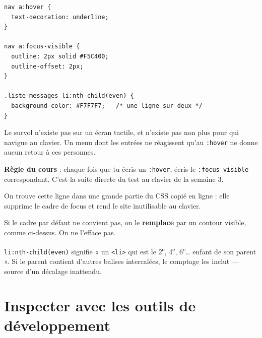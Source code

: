 \documentclass[a4paper,11pt]{article}
\begin{document}
\begin{lstlisting}[language=CSS3, caption={Retour visuel sur les liens et lignes alternées}]
nav a:hover {
  text-decoration: underline;
}

nav a:focus-visible {
  outline: 2px solid #F5C400;
  outline-offset: 2px;
}

.liste-messages li:nth-child(even) {
  background-color: #F7F7F7;   /* une ligne sur deux */
}
\end{lstlisting}

\begin{tcolorbox}[interdit, title={\texttt{:hover} seul exclut la moitié des utilisateurs}]
Le survol n'existe pas sur un écran tactile, et n'existe pas non plus pour qui navigue au clavier. Un menu dont les entrées ne réagissent qu'au \texttt{:hover} ne donne aucun retour à ces personnes.

\vspace{3pt}
\textbf{Règle du cours} : chaque fois que tu écris un \texttt{:hover}, écris le \texttt{:focus-visible} correspondant. C'est la suite directe du test au clavier de la semaine 3.
\end{tcolorbox}

\begin{tcolorbox}[attention, title={Rappel --- ne jamais écrire \texttt{outline: none}}]
On trouve cette ligne dans une grande partie du CSS copié en ligne : elle supprime le cadre de focus et rend le site inutilisable au clavier.

\vspace{3pt}
Si le cadre par défaut ne convient pas, on le \textbf{remplace} par un contour visible, comme ci-dessus. On ne l'efface pas.
\end{tcolorbox}

\begin{tcolorbox}[astuce, title={\texttt{:nth-child} compte les frères, pas les éléments visés}]
\texttt{li:nth-child(even)} signifie « un \texttt{<li>} qui est le 2\textsuperscript{e}, 4\textsuperscript{e}, 6\textsuperscript{e}\ldots{} enfant de son parent ». Si le parent contient d'autres balises intercalées, le comptage les inclut --- source d'un décalage inattendu.
\end{tcolorbox}

\section{Inspecter avec les outils de développement}
\end{document}
